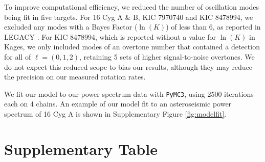 \documentclass[12pt]{article}
\begin{document}
To improve computational efficiency, we reduced the number of oscillation modes being fit in five targets. For 16 Cyg A \& B, KIC 7970740 and KIC 8478994, we excluded any modes with a Bayes Factor ($\ln(K)$) of less than 6, as reported in LEGACY \cite{davies+2016,lund+2017,kass+raftery1995}. For KIC 8478994, which is reported without a value for $\ln(K)$ in Kages, we only included modes of an overtone number that contained a detection for all of $\ell = (0, 1, 2)$, retaining 5 sets of higher signal-to-noise overtones. We do not expect this reduced scope to bias our results, although they may reduce the precision on our measured rotation rates.

We fit our model to our power spectrum data with \texttt{PyMC3}, using 2500 iterations each on 4 chains. An example of our model fit to an asteroseismic power spectrum of 16 Cyg A is shown in Supplementary Figure \ref{fig:modelfit}.

\section{Supplementary Table}

\end{document}
